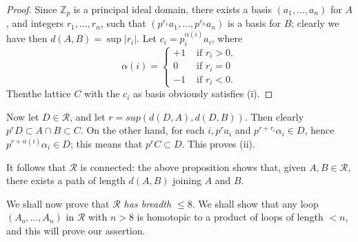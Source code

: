 \begin{proof}
  Since $\mathbb{Z}_p$ is a principal ideal domain, there exists a basis
  $(a_1, \ldots , a_n)$ for $A$, and integers $r_1, \ldots , r_n$, such
  that $(p^{r_1} a_1, \ldots ,p^{r_n} a_n)$ is a basis for $B$; clearly
  we have then $d(A,B) = \sup |r_i|$. Let $c_i =p_i^{\alpha(i)} a_i$, where  
  \begin{equation*}
    \alpha (i)=
    \begin{cases}
      +1  & \text{ if } r_i >0,\\
      0  & \text{ if } r_i = 0 \\
      -1 & \text{ if } r_i < 0.
    \end{cases}
  \end{equation*}
  Then\pageoriginale the lattice $C$ with the $c_i$ as basis obviously
  satisfies (i). 
\end{proof}

Now let $D \in  \mathcal{R}$, and let $r = sup (d(D,A),d(D,B))$. Then
clearly $p^r D \subset A \cap B \subset C$. On the other hand, for
each $i, p^r a_i$ and $p^{r+r_i} \alpha_i \in D$, hence $p^{r+
  \alpha(i)} \alpha_i \in D$; this means that $p^r C \subset D$. This
proves (ii). 

It follows that $ \mathcal{R}$ is connected: the above proposition
shows that, given $A, B \in  \mathcal{R}$, there exists a path of
length $d(A,B)$ joining $A $ and $B$. 

We shall now prove that \textit{$ \mathcal{R}$ has breadth $\leq
  8$}. We shall show that any loop $(A_o, \ldots , A_n)$ in $
\mathcal{R}$ with $n > 8$ is homotopic to a product of loops of length
$<n$, and this will prove our assertion. 

